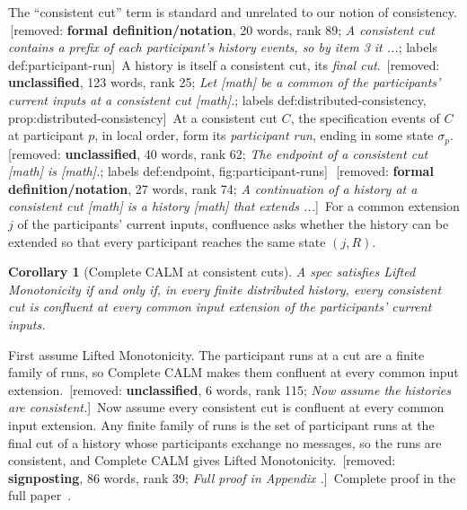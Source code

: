 \documentclass[sigconf]{cidr-2027}
\makeatletter
\newtheorem{corollary}{Corollary}
\theoremstyle{remark}
\newcommand{\indesc}{input extension\xspace} %
\newcommand{\fullproof}{Complete proof in the full paper~\cite{hellerstein2026completecalmfull}.}
\renewenvironment{proof}[1][\proofname]{\par
  \pushQED{\qed}\normalfont\topsep2\p@\relax
  \trivlist\item[\@proofindent\hskip\labelsep{\@proofnamefont #1\@addpunct{.}}]\ignorespaces
}{\popQED\endtrivlist\@endpefalse}
\newcommand{\removednote}[1]{{\color{cutred}\footnotesize\,[removed: #1]\,}}
\makeatother
\begin{document}
\textcolor{newblue}{The ``consistent cut'' term is standard and unrelated to our notion of consistency.} \removednote{\textbf{formal definition/notation}, 20 words, rank 89; \textit{A consistent cut contains a prefix of each participant's history events, so by item 3 it ...}; labels def:participant-run} \textcolor{newblue}{A history
is itself a consistent cut, its \emph{final cut}.} \removednote{\textbf{unclassified}, 123 words, rank 25; \textit{Let [math] be a common of the participants' current inputs at a consistent cut [math].}; labels def:distributed-consistency, prop:distributed-consistency} \textcolor{newblue}{At a
consistent cut $C$, the specification events of $C$ at participant $p$,
in local order, form its \emph{participant run}, ending in some state
$\sigma_p$.} \removednote{\textbf{unclassified}, 40 words, rank 62; \textit{The endpoint of a consistent cut [math] is [math].}; labels def:endpoint, fig:participant-runs} \removednote{\textbf{formal definition/notation}, 27 words, rank 74; \textit{A continuation of a history at a consistent cut [math] is a history [math] that extends ...}} \textcolor{newblue}{For a common extension $j$ of the participants' current inputs,
confluence asks whether the history can be extended so that every participant
reaches the same state $(j,R)$.}

\begin{corollary}[Complete CALM at consistent cuts]
\label{cor:distributed-calm}
\textcolor{newblue}{A spec satisfies Lifted Monotonicity if and only if, in every finite
distributed history, every consistent cut is confluent at every common
\indesc of the participants' current inputs.}
\end{corollary}

\begin{proof}[Proof sketch]
\textcolor{newblue}{First assume Lifted Monotonicity.} \textcolor{newblue}{The participant runs at a cut are a finite
family of runs, so Complete CALM makes them confluent at every common
\indesc.} \removednote{\textbf{unclassified}, 6 words, rank 115; \textit{Now assume the histories are consistent.}} \textcolor{newblue}{Now assume every consistent cut is confluent at every common \indesc.} \textcolor{newblue}{Any finite family of runs is the set of
participant runs at the final cut of a history whose participants exchange no
messages, so the runs are consistent, and Complete CALM gives Lifted
Monotonicity.} \removednote{\textbf{signposting}, 86 words, rank 39; \textit{Full proof in Appendix .}} \textcolor{newblue}{\fullproof}
\end{proof}
\end{document}
